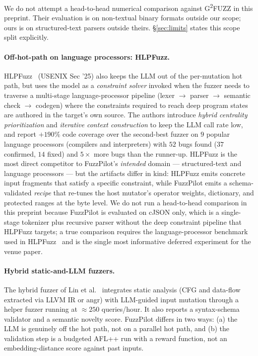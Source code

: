 \documentclass[11pt]{article}
\begin{document}
We do not attempt a head-to-head numerical comparison against
G\textsuperscript{2}FUZZ in this preprint. Their evaluation is on
non-textual binary formats outside our scope; ours is on
structured-text parsers outside theirs. \S\ref{sec:limits} states
this scope split explicitly.

\paragraph{Off-hot-path on language processors:
HLPFuzz.}
HLPFuzz~\cite{yang2025hlpfuzz} (USENIX Sec '25) also keeps the LLM
out of the per-mutation hot path, but uses the model as a
\emph{constraint solver} invoked when the fuzzer needs to traverse a
multi-stage language-processor pipeline
(lexer $\rightarrow$ parser $\rightarrow$ semantic check $\rightarrow$
codegen) where the constraints required to reach deep program states
are authored in the target's own source. The authors introduce
\emph{hybrid centrality prioritization} and \emph{iterative context
construction} to keep the LLM call rate low, and report
$+190\%$ code coverage over the second-best fuzzer on $9$ popular
language processors (compilers and interpreters) with $52$ bugs
found ($37$ confirmed, $14$ fixed) and $5\times$ more bugs than the
runner-up. HLPFuzz is the most direct competitor to FuzzPilot's
\emph{intended} domain --- structured-text and language processors ---
but the artifacts differ in kind: HLPFuzz emits concrete input
fragments that satisfy a specific constraint, while FuzzPilot emits a
schema-validated \emph{recipe} that re-tunes the host mutator's
operator weights, dictionary, and protected ranges at the byte
level. We do not run a head-to-head comparison in this preprint
because FuzzPilot is evaluated on cJSON only, which is a single-stage
tokenizer plus recursive parser without the deep constraint pipeline
that HLPFuzz targets; a true comparison requires the
language-processor benchmark used in
HLPFuzz~\cite{yang2025hlpfuzz} and is the single most informative
deferred experiment for the venue paper.

\paragraph{Hybrid static-and-LLM fuzzers.}
The hybrid fuzzer of Lin et al.~\cite{lin2025hybrid} integrates
static analysis (CFG and data-flow extracted via LLVM IR or angr)
with LLM-guided input mutation through a helper fuzzer running at
$\approx 250$ queries/hour. It also reports a syntax-schema
validator and a semantic novelty score. FuzzPilot differs in two
ways: (a) the LLM is genuinely off the hot path, not on a parallel
hot path, and (b) the validation step is a budgeted AFL++ run with
a reward function, not an embedding-distance score against past
inputs.
\end{document}
